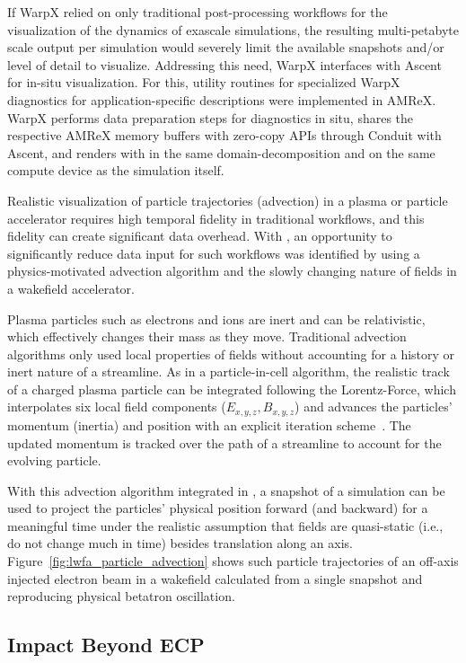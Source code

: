 If WarpX relied on only traditional post-processing workflows for the visualization of the dynamics of exascale simulations, the resulting multi-petabyte scale output per simulation would severely limit the available snapshots and/or level of detail to visualize.
Addressing this need, WarpX interfaces with Ascent for in-situ visualization.
For this, utility routines for specialized WarpX diagnostics for application-specific descriptions were implemented in AMReX.
WarpX performs data preparation steps for diagnostics in situ, shares the respective AMReX memory buffers with zero-copy APIs through Conduit with Ascent, and renders with \vtkm in the same domain-decomposition and on the same compute device as the simulation itself.

Realistic visualization of particle trajectories (advection) in a plasma or particle accelerator requires high temporal fidelity in traditional workflows, and this fidelity can create significant data overhead.
With \vtkm, an opportunity to significantly reduce data input for such workflows was identified by using a physics-motivated advection algorithm and the slowly changing nature of fields in a wakefield accelerator.

Plasma particles such as electrons and ions are inert and can be relativistic, which effectively changes their mass as they move.
Traditional advection algorithms only used local properties of fields without accounting for a history or inert nature of a streamline.
As in a particle-in-cell algorithm, the realistic track of a charged plasma particle can be integrated following the Lorentz-Force, which interpolates six local field components ($E_{x,y,z}, B_{x,y,z}$) and advances the particles' momentum (inertia) and position with an explicit iteration scheme~\citep{Boris1970}.
The updated momentum is tracked over the path of a streamline to account for the evolving particle.

With this advection algorithm integrated in \vtkm, a snapshot of a simulation can be used to project the particles' physical position forward (and backward) for a meaningful time under the realistic assumption that fields are quasi-static (i.e., do not change much in time) besides translation along an axis.
Figure~\ref{fig:lwfa_particle_advection} shows such particle trajectories of an off-axis injected electron beam in a wakefield calculated from a single snapshot and reproducing physical betatron oscillation.

\subsection{Impact Beyond ECP}

